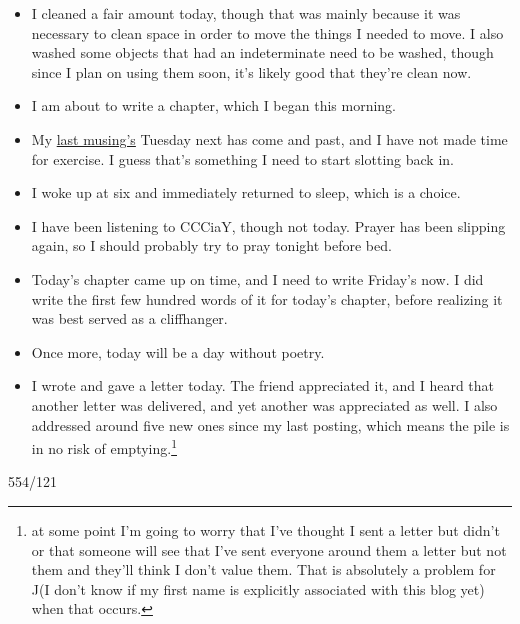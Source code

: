 \documentclass[12pt]{article}[titlepage]
\newcommand{\1}{\={a}}
\newcommand{\2}{\={e}}
\newcommand{\3}{\={\i}}
\newcommand{\4}{\=o}
\newcommand{\5}{\=u}
\newcommand{\6}{\={A}}
\renewcommand{\,}{\textsuperscript{,}}
\begin{document}
\begin{itemize}
\item I cleaned a fair amount today, though that was mainly because it was necessary to clean space in order to move the things I needed to move. I also washed some objects that had an indeterminate need to be washed, though since I plan on using them soon, it's likely good that they're clean now.
\item I am about to write a chapter, which I began this morning.
\item My \href{conference-2.html}{last musing's} Tuesday next has come and past, and I have not made time for exercise.
I guess that's something I need to start slotting back in.
\item I woke up at six and immediately returned to sleep, which is a choice.
\item I have been listening to CCCiaY, though not today. Prayer has been slipping again, so I should probably try to pray tonight before bed.
\item Today's chapter came up on time, and I need to write Friday's now. I did write the first few hundred words of it for today's chapter, before realizing it was best served as a cliffhanger.
\item Once more, today will be a day without poetry.
\item I wrote and gave a letter today. The friend appreciated it, and I heard that another letter was delivered, and yet another was appreciated as well.
I also addressed around five new ones since my last posting, which means the pile is in no risk of emptying.\footnote{at some point I'm going to worry that I've thought I sent a letter but didn't or that someone will see that I've sent everyone around them a letter but not them and they'll think I don't value them. That is absolutely a problem for J(I don't know if my first name is explicitly associated with this blog yet) when that occurs.}
\end{itemize}

554/121
\end{document}
